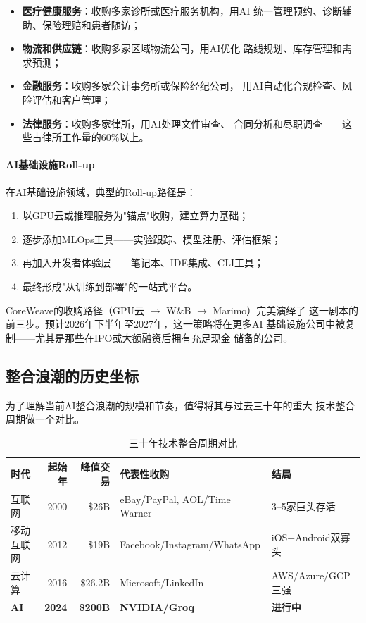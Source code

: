 \begin{itemize}
  \item \textbf{医疗健康服务}：收购多家诊所或医疗服务机构，用AI
    统一管理预约、诊断辅助、保险理赔和患者随访；
  \item \textbf{物流和供应链}：收购多家区域物流公司，用AI优化
    路线规划、库存管理和需求预测；
  \item \textbf{金融服务}：收购多家会计事务所或保险经纪公司，
    用AI自动化合规检查、风险评估和客户管理；
  \item \textbf{法律服务}：收购多家律所，用AI处理文件审查、
    合同分析和尽职调查——这些占律所工作量的60\%以上。
\end{itemize}

\paragraph{AI基础设施Roll-up}
在AI基础设施领域，典型的Roll-up路径是：

\begin{enumerate}
  \item 以GPU云或推理服务为"锚点"收购，建立算力基础；
  \item 逐步添加MLOps工具——实验跟踪、模型注册、评估框架；
  \item 再加入开发者体验层——笔记本、IDE集成、CLI工具；
  \item 最终形成"从训练到部署"的一站式平台。
\end{enumerate}

CoreWeave的收购路径（GPU云 $\to$ W\&B $\to$ Marimo）完美演绎了
这一剧本的前三步。预计2026年下半年至2027年，这一策略将在更多AI
基础设施公司中被复制——尤其是那些在IPO或大额融资后拥有充足现金
储备的公司。


\subsection{整合浪潮的历史坐标}
\label{subsec:outlook-consolidation-history}

为了理解当前AI整合浪潮的规模和节奏，值得将其与过去三十年的重大
技术整合周期做一个对比。

\begin{table}[htbp]
\centering
\caption{三十年技术整合周期对比}
\label{tab:consolidation-cycles}
\small
\begin{tabularx}{\textwidth}{lrrXX}
\toprule
\rowcolor{figLightGray}
\textbf{时代} & \textbf{起始年} & \textbf{峰值交易} &
  \textbf{代表性收购} & \textbf{结局} \\
\midrule
互联网 & 2000 & \$26B & eBay/PayPal, AOL/Time Warner &
  3--5家巨头存活 \\
移动互联网 & 2012 & \$19B & Facebook/Instagram/WhatsApp &
  iOS+Android双寡头 \\
云计算 & 2016 & \$26.2B & Microsoft/LinkedIn &
  AWS/Azure/GCP三强 \\
\textbf{AI} & \textbf{2024} & \textbf{\$200B} &
  \textbf{NVIDIA/Groq} & \textbf{进行中} \\
\bottomrule
\end{tabularx}
\end{table}

